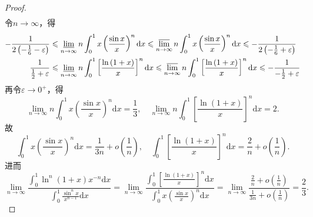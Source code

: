 \documentclass[../../main.tex]{subfiles}%
\begin{document}
\begin{proof}
\begin{gather*}
\end{gather*}
令$n\rightarrow \infty$，得
\begin{align*}
-\frac{1}{2\left( -\frac{1}{6}-\varepsilon \right)}&\leqslant \varliminf_{n\to \infty}n\int_0^1{x\left( \frac{\sin x}{x} \right) ^n\mathrm{d}x}\leqslant \varlimsup_{n\to \infty}n\int_0^1{x\left( \frac{\sin x}{x} \right) ^n\mathrm{d}x}\leqslant -\frac{1}{2\left( -\frac{1}{6}+\varepsilon \right)}\\
\frac{1}{\frac{1}{2}+\varepsilon}&\leqslant \varliminf_{n\to \infty}n\int_0^1{\left[ \frac{\ln \left( 1+x \right)}{x} \right] ^n\mathrm{d}x}\leqslant \varlimsup_{n\to \infty}n\int_0^1{\left[ \frac{\ln \left( 1+x \right)}{x} \right] ^n\mathrm{d}x}\leqslant -\frac{1}{-\frac{1}{2}+\varepsilon}
\end{align*}
再令$\varepsilon \rightarrow 0^+$，得
\[
\lim\limits_{n\rightarrow \infty}n\int_0^1{x\left( \frac{\sin x}{x} \right) ^n\mathrm{d}x}=\frac{1}{3},\quad \lim\limits_{n\rightarrow \infty}n\int_0^1{\left[ \frac{\ln \left( 1+x \right)}{x} \right] ^n\mathrm{d}x}=2.
\]
故
\[
\int_0^1{x\left( \frac{\sin x}{x} \right) ^n\mathrm{d}x}=\frac{1}{3n}+o\left( \frac{1}{n} \right) ,\quad \int_0^1{\left[ \frac{\ln \left( 1+x \right)}{x} \right] ^n\mathrm{d}x}=\frac{2}{n}+o\left( \frac{1}{n} \right) .
\]
进而
\[
\lim\limits_{n\rightarrow \infty}\frac{\int_0^1{\ln ^n(1 + x)x^{-n}\mathrm{d}x}}{\int_0^1{\frac{\sin ^nx}{x^{n-1}}\mathrm{d}x}}=\lim\limits_{n\rightarrow \infty}\frac{\int_0^1{\left[ \frac{\ln \left( 1+x \right)}{x} \right] ^n\mathrm{d}x}}{\int_0^1{x\left( \frac{\sin x}{x} \right) ^n\mathrm{d}x}}=\lim\limits_{n\rightarrow \infty}\frac{\frac{2}{n}+o\left( \frac{1}{n} \right)}{\frac{1}{3n}+o\left( \frac{1}{n} \right)}=\frac{2}{3}.
\]
\end{proof}
\end{document}
